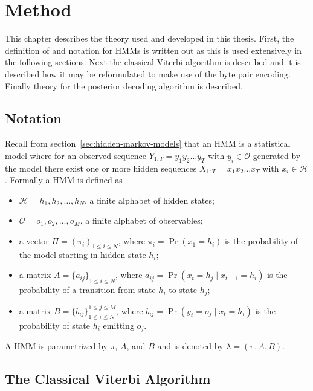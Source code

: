 \chapter{Method}
\label{cha:method}

This chapter describes the theory used and developed in this thesis. First, the
definition of and notation for HMMs is written out as this is used extensively
in the following sections. Next the classical Viterbi algorithm is described
and it is described how it may be reformulated to make use of the byte pair
encoding. Finally theory for the posterior decoding algorithm is described.

\section{Notation}

Recall from section~\ref{sec:hidden-markov-models} that an HMM is a statistical
model where for an observed sequence $Y_{1:T} = y_1y_2\dots{}y_T$ with
$y_i \in \mathcal{O}$ generated by the model there exist one or more hidden
sequences $X_{1:T} = x_1x_2\dots{}x_T$ with $x_i \in \mathcal{H}$. Formally a
HMM is defined as
\begin{itemize}
\item $\mathcal{H} = {h_1, h_2, \dots, h_N}$, a finite alphabet of hidden
  states;
\item $\mathcal{O} = {o_1, o_2, \dots, o_M}$, a finite alphabet of observables;
\item a vector $\Pi = {(\pi_i)}_{1 \le i \le N}$, where $\pi_i = \Pr(x_1 =
  h_i)$ is the probability of the model starting in hidden state $h_i$;
\item a matrix $A = {\{a_{ij}\}}_{1 \le i \le N}$, where $a_{ij} = \Pr(x_t
  = h_j \mid x_{t - 1} = h_i)$ is the probability of a transition from state
  $h_i$ to state $h_j$;
\item a matrix $B = {\{b_{ij}\}}_{1 \le i \le N}^{1 \le j \le M}$, where
  $b_{ij} = \Pr(y_t = o_j \mid x_t = h_i)$ is the probability of state
  $h_i$ emitting $o_j$.
\end{itemize}
A HMM is parametrized by $\pi$, $A$, and $B$ and is denoted by $\lambda =
(\pi, A, B)$.

\section{The Classical Viterbi Algorithm}
\label{sec:class-viterbi-algor}

